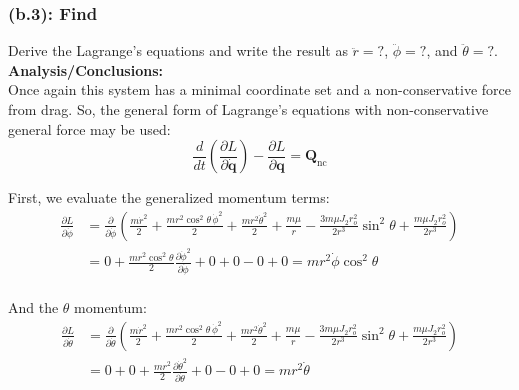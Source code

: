 \documentclass[titlepage]{article}
\begin{document}
\subsubsection*{(b.3): Find}

Derive the Lagrange's equations and write the result as $\ddot{r}=?$, $\ddot{\phi}=?$, and $\ddot{\theta}=?$.\\

\textbf{Analysis/Conclusions:}\\

Once again this system has a minimal coordinate set and a non-conservative force from drag. So, the general form of Lagrange's equations with non-conservative general force may be used:
\begin{equation}
	\frac{d}{dt}\left(\frac{\partial L}{\partial\dot{\boldsymbol{q}}}\right)-\frac{\partial L}{\partial\boldsymbol{q}}=\boldsymbol{Q}_{\text{nc}}
	\label{eq:lagrangenc}
\end{equation}

First, we evaluate the generalized momentum terms:
\begin{equation}
	\begin{split}
		\frac{\partial L}{\partial\dot{\phi}}&=\frac{\partial}{\partial\dot{\phi}}\left(\frac{m\dot{r}^2}{2}+\frac{mr^2\cos^2\theta\,\dot{\phi}^2}{2}+\frac{mr^2\dot{\theta}^2}{2}+\frac{m\mu}{r}-\frac{3m\mu J_2r_o^2}{2r^3}\sin^2\theta+\frac{m\mu J_2r_o^2}{2r^3}\right) \\
		&=0+\frac{mr^2\cos^2\theta}{2}\frac{\partial\dot{\phi}^2}{\partial\dot{\phi}}+0+0-0+0=mr^2\dot{\phi}\cos^2\theta \\
	\end{split}
	\label{eq:phimomentum}
\end{equation}

And the $\theta$ momentum:
\begin{equation}
	\begin{split}
		\frac{\partial L}{\partial\dot{\theta}}&=\frac{\partial}{\partial\dot{\theta}}\left(\frac{m\dot{r}^2}{2}+\frac{mr^2\cos^2\theta\,\dot{\phi}^2}{2}+\frac{mr^2\dot{\theta}^2}{2}+\frac{m\mu}{r}-\frac{3m\mu J_2r_o^2}{2r^3}\sin^2\theta+\frac{m\mu J_2r_o^2}{2r^3}\right) \\
		&=0+0+\frac{mr^2}{2}\frac{\partial\dot{\theta}^2}{\partial\dot{\theta}}+0-0+0=mr^2\dot{\theta} \\
	\end{split}
	\label{eq:thetamomentum}
\end{equation}
\end{document}
